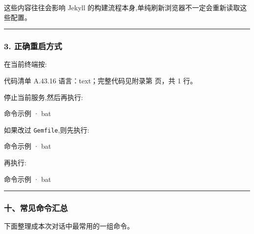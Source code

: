 \documentclass[lang=cn,scheme=chinese,color=blue,device=normal,toc=onecol,math=cm]{elegantbook}
\begin{document}
这些内容往往会影响 Jekyll 的构建流程本身,单纯刷新浏览器不一定会重新读取这些配置。\par


\medskip\hrule\medskip


\subsubsection{3. 正确重启方式}


在当前终端按:\par


\begin{codeindexbox}{代码清单 A.43.16}
语言：text；完整代码见附录第 \pageref{code:43:16} 页，共 1 行。
\end{codeindexbox}


停止当前服务,然后再执行:\par


\begin{inlinecodebox}{命令示例 · bat}
\end{inlinecodebox}


如果改过 \texttt{Gemfile},则先执行:\par


\begin{inlinecodebox}{命令示例 · bat}
\end{inlinecodebox}


再执行:\par


\begin{inlinecodebox}{命令示例 · bat}
\end{inlinecodebox}


\medskip\hrule\medskip


\subsubsection{十、常见命令汇总}


下面整理成本次对话中最常用的一组命令。\par
\end{document}
